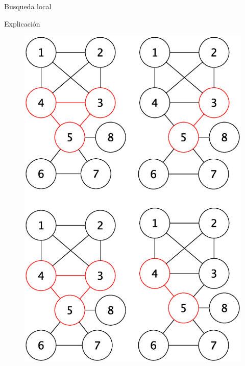 \begin{section}{Busqueda local}
\begin{subsection}{Explicación}
			\begin{figure}[H]
				\centering
		    	\includegraphics[scale=0.5]{busqueda_local/seguimiento.eps}
			\end{figure}
			\begin{figure}[H]
				\centering

\end{figure}
\end{subsection}
\end{section}
